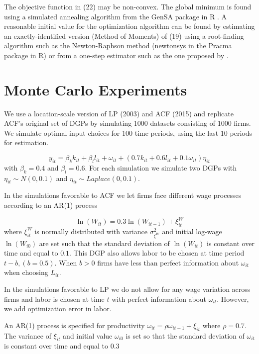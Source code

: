 \documentclass[11pt]{article}
\begin{document}
The objective function in (22) may be non-convex. The global minimum is found using a simulated annealing algorithm from the GenSA package in R \citep{Xiang2013}. A reasonable initial value for the optimization algorithm can be found by estimating an exactly-identified version (Method of Moments) of (19) using a root-finding algorithm such as the Newton-Raphson method (newtonsys in the Pracma \nocite{pracma} package in R) or from a one-step estimator such as the one proposed by \cite{Newey1994}.
\newpage
\section{Monte Carlo Experiments}
We use a location-scale version of LP (2003) and ACF (2015) and replicate ACF's original set of DGPs by simulating 1000 datasets consisting of 1000 firms. We simulate optimal input choices for 100 time periods, using the last 10 periods for estimation. 

\begin{equation}
y_{it}=\beta_{k}k_{it}+\beta_{l}l_{it}+\omega_{it}+(0.7k_{it}+0.6l_{it}+0.1\omega_{it})\eta_{it}
\end{equation}
with $\beta_{k}=0.4$ and $\beta_{l}=0.6$. For each simulation we simulate two DGPs with $\eta_{it}\sim N(0,0.1)$ and $\eta_{it}\sim Laplace(0,0.1)$.

In the simulations favorable to ACF we let firms face different wage processes according to an AR(1) process

\begin{equation*}
    \ln(W_{it})=0.3\ln(W_{it-1})+\xi_{it}^{W}
\end{equation*}
where $\xi_{it}^{W}$ is normally distributed with variance $\sigma_{\xi^{W}}^{2}$ and initial log-wage $\ln(W_{i0})$ are set such that the standard deviation of $\ln(W_{it})$ is constant over time and equal to $0.1$. This DGP also allows labor to be chosen at time period $t-b, (b=0.5)$. When $b>0$ firms have less than perfect information about $\omega_{it}$ when choosing $L_{it}$. 

In the simulations favorable to LP we do not allow for any wage variation across firms and labor is chosen at time $t$ with perfect information about $\omega_{it}$. However, we add optimization error in labor.

An AR(1) process is specified for productivity $\omega_{it}=\rho\omega_{it-1}+\xi_{it}$ where $\rho=0.7$. The variance of $\xi_{it}$ and initial value $\omega_{i0}$ is set so that the standard deviation of $\omega_{it}$ is constant over time and equal to $0.3$
\end{document}
